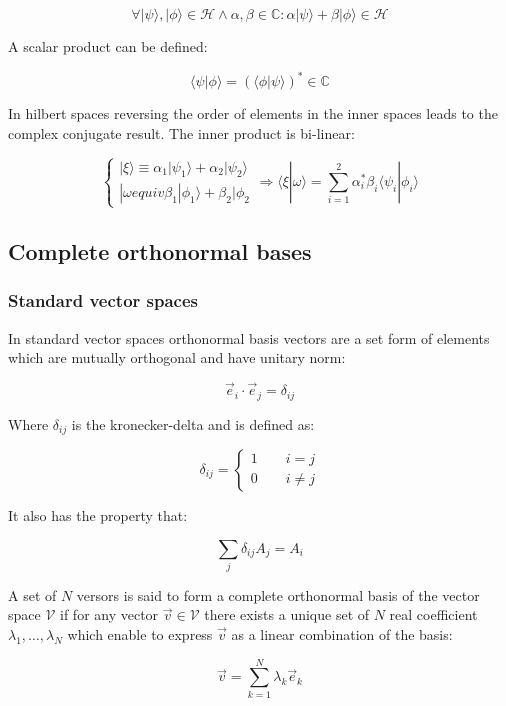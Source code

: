 		$$\forall |\psi\rangle,|\phi\rangle\in\mathcal{H}\land \alpha,\beta\in\mathbb{C}: \alpha|\psi\rangle + \beta|\phi\rangle\in\mathcal{H}$$

		A scalar product can be defined:

		$$\langle\psi|\phi\rangle = (\langle\phi|\psi\rangle)^*\in\mathbb{C}$$

		In hilbert spaces reversing the order of elements in the inner spaces leads to the complex conjugate result.
		The inner product is bi-linear:

		$$\begin{cases}|\xi\rangle \equiv \alpha_1|\psi_1\rangle + \alpha_2|\psi_2\rangle\\|\omega equiv \beta_1|\phi_1\rangle + \beta_2|\phi_2\end{cases}\Rightarrow \langle\xi|\omega\rangle = \sum\limits_{i=1}^2\alpha_i^*\beta_i\langle \psi_i|\phi_i\rangle$$

	\subsection{Complete orthonormal bases}
	
		\subsubsection{Standard vector spaces}
		In standard vector spaces orthonormal basis vectors are a set form of elements which are mutually orthogonal and have unitary norm:

		$$\vec{e}_i\cdot\vec{e}_j = \delta_{ij}$$

		Where $\delta_{ij}$ is the kronecker-delta and is defined as:

		$$\delta_{ij} = \begin{cases}1\qquad i = j\\ 0\qquad i\neq j\end{cases}$$

		It also has the property that:

		$$\sum\limits_j\delta_{ij}A_j = A_i$$

		A set of $N$ versors is said to form a complete orthonormal basis of the vector space $\mathcal{V}$ if for any vector $\vec{v}\in\mathcal{V}$ there exists a unique set of $N$ real coefficient $\lambda_1, \dots, \lambda_N$ which enable to express $\vec{v}$ as a linear combination of the basis:

		$$\vec{v} = \sum\limits_{k=1}^N\lambda_k\vec{e}_k$$

